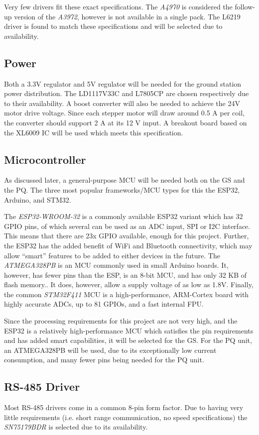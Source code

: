 Very few drivers fit these exact specifications. The \textit{A4970} is considered the follow-up version of the \textit{A3972}, however is not available in a single pack. The L6219 driver is found to match these specifications and will be selected due to availability.

\subsection{Power}
Both a 3.3V regulator and 5V regulator will be needed for the ground station power distribution. The LD1117V33C and L7805CP are chosen respectively due to their availability. A boost converter will also be needed to achieve the 24V motor drive voltage. Since each stepper motor will draw around 0.5 A per coil, the converter should support 2 A at its 12 V input. A breakout board based on the XL6009 IC will be used which meets this specification.

\subsection{Microcontroller}
As discussed later, a general-purpose MCU will be needed both on the GS and the PQ. The three most popular frameworks/MCU types for this the ESP32, Arduino, and STM32.

The \textit{ESP32-WROOM-32} is a commonly available ESP32 variant which has 32 GPIO pins, of which several can be used as an ADC input, SPI or I2C interface. This means that there are 23x GPIO available, enough for this project. Further, the ESP32 has the added benefit of WiFi and Bluetooth connectivity, which may allow “smart” features to be added to either devices in the future. The \textit{ATMEGA328PB} is an MCU commonly used in small Arduino boards. It, however, has fewer pins than the ESP, is an 8-bit MCU, and has only 32 KB of flash memory.. It does, however, allow a supply  voltage of as low as 1.8V. Finally, the common \textit{STM32F411} MCU is a high-performance, ARM-Cortex board with highly accurate ADCs, up to 81 GPIOs, and a fast internal FPU.

Since the processing requirements for this project are not very high, and the ESP32 is a relatively high-performance MCU which satisfies the pin requirements and has added smart capabilities, it will be selected for the GS. For the PQ unit, an ATMEGA328PB will be used, due to its exceptionally low current consumption, and many fewer pins being needed for the PQ unit.

\subsection{RS-485 Driver}
Most RS-485 drivers come in a common 8-pin form factor. Due to having very little requirements (i.e. short range communication, no speed specifications) the \textit{SN75179BDR} is selected due to its availability.